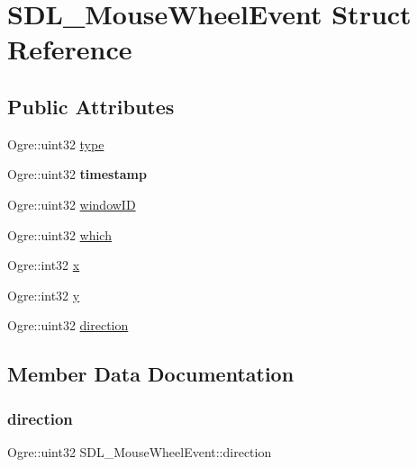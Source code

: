 \hypertarget{struct_s_d_l___mouse_wheel_event}{}\section{S\+D\+L\+\_\+\+Mouse\+Wheel\+Event Struct Reference}
\label{struct_s_d_l___mouse_wheel_event}
\subsection*{Public Attributes}
\begin{DoxyCompactItemize}
\item 
Ogre\+::uint32 \hyperlink{struct_s_d_l___mouse_wheel_event_af95b38618d3b8f1b22e6e0f600f02a39}{type}
\item 
\mbox{\label{struct_s_d_l___mouse_wheel_event_ac31470acee60100e7df5ad4e16134f44}} 
Ogre\+::uint32 {\bfseries timestamp}
\item 
Ogre\+::uint32 \hyperlink{struct_s_d_l___mouse_wheel_event_a80feacc82c79a2372dd1b6efd6003f65}{window\+ID}
\item 
Ogre\+::uint32 \hyperlink{struct_s_d_l___mouse_wheel_event_a34a577db46da6faff1cb26a1ee4ef5fb}{which}
\item 
Ogre\+::int32 \hyperlink{struct_s_d_l___mouse_wheel_event_aeeed8bd6eaf755b8070af04f6fae690a}{x}
\item 
Ogre\+::int32 \hyperlink{struct_s_d_l___mouse_wheel_event_a7907297ede875bc78f9cf38f51f22b72}{y}
\item 
Ogre\+::uint32 \hyperlink{struct_s_d_l___mouse_wheel_event_a32c2542711cc174c519169cb0557a78a}{direction}
\end{DoxyCompactItemize}


\subsection{Member Data Documentation}
\mbox{\label{struct_s_d_l___mouse_wheel_event_a32c2542711cc174c519169cb0557a78a}} 
\subsubsection{\texorpdfstring{direction}{direction}}
{\footnotesize\ttfamily Ogre\+::uint32 S\+D\+L\+\_\+\+Mouse\+Wheel\+Event\+::direction}

